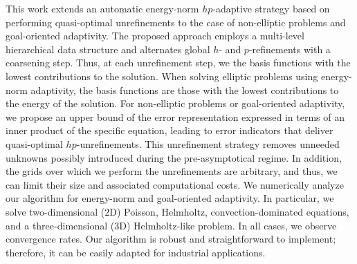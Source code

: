 

This work extends an automatic energy-norm $hp$-adaptive strategy based on performing quasi-optimal unrefinements to the case of non-elliptic problems and goal-oriented adaptivity. The proposed approach employs a multi-level hierarchical data structure and alternates global $h$- and $p$-refinements with a coarsening step. Thus, at each unrefinement step, we  the basis functions with the lowest contributions to the solution. When solving elliptic problems using energy-norm adaptivity, the  basis functions are those with the lowest contributions to the energy of the solution. For non-elliptic problems or goal-oriented adaptivity, we propose an upper bound of the error representation expressed in terms of an inner product of the specific equation, leading to error indicators that deliver quasi-optimal $hp$-unrefinements. This unrefinement strategy removes unneeded unknowns possibly introduced during the pre-asymptotical regime. In addition, the grids over which we perform the unrefinements are arbitrary, and thus, we can limit their size and associated computational costs. We numerically analyze our algorithm for energy-norm and goal-oriented adaptivity. In particular, we solve two-dimensional ($2$D) Poisson, Helmholtz, convection-dominated equations, and a three-dimensional ($3$D) Helmholtz-like problem. In all cases, we observe  convergence rates. Our algorithm is robust and straightforward to implement; therefore, it can be easily adapted for industrial applications.










